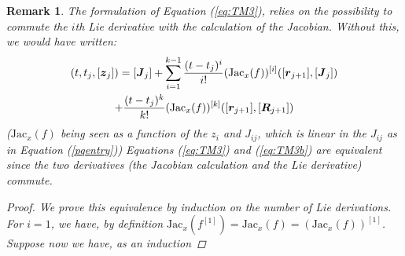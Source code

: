 \documentclass{sig-alternate-05-2015} %
\newcommand\ForAuthors[1]%
 {\par\smallskip                     %
  \begin{center}%
   \fbox%
   {\parbox{0.9\linewidth}%
    {\raggedright\sc--- #1}%
   }%
  \end{center}%
  \par\smallskip                     %
 }
\newtheorem{remark}{Remark}
\begin{document}
\begin{remark}
The formulation of Equation (\ref{eq:TM3}), 
relies on the possibility to commute the $i$th Lie derivative
with the calculation of the Jacobian. Without this, we would have written:
\begin{multline}
[\J](t,t_j,[{\z}_j]) = [{\J}_j] + \sum\limits_{i=1}^{k-1} \frac{(t-t_j)^i}{i !} (\mbox{Jac}_x(f))^{[i]}([{\r}_{j+1}],[{\J}_j]) \\ +  \frac{(t-t_j)^k}{k !} (\mbox{Jac}_x(f))^{[k]}([{\r}_{j+1}],[\bfm{R}_{j+1}])
\label{eq:TM3b}
\end{multline}
\noindent ($\mbox{Jac}_x(f)$ being seen as a function of the $z_i$ and $J_{ij}$, which 
is linear in the $J_{ij}$ as in Equation (\ref{pqentry}))
Equations (\ref{eq:TM3}) and (\ref{eq:TM3b}) are equivalent since the two derivatives (the Jacobian calculation
and the Lie derivative) commute.  
\begin{proof}
We prove this equivalence by induction on the number of Lie derivations. 
For $i=1$, we have, by definition $\mbox{Jac}_x(f^{[1]})
=\mbox{Jac}_x(f)=(\mbox{Jac}_x(f))^{[1]}$. Suppose now we have, as an induction

\end{proof}
\end{remark}
\end{document}
